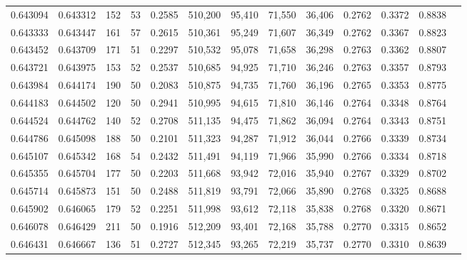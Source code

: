 \begin{tabular}{rrrrrrrrrrrrr}
0.643094 & 0.643312 &    152 &    53 &                                     0.2585 & 510,200 &  95,410 &  71,550 &  36,406 & 0.2762 & 0.3372 & 0.8838 \\
0.643333 & 0.643447 &    161 &    57 &                                     0.2615 & 510,361 &  95,249 &  71,607 &  36,349 & 0.2762 & 0.3367 & 0.8823 \\
0.643452 & 0.643709 &    171 &    51 &                                     0.2297 & 510,532 &  95,078 &  71,658 &  36,298 & 0.2763 & 0.3362 & 0.8807 \\
0.643721 & 0.643975 &    153 &    52 &                                     0.2537 & 510,685 &  94,925 &  71,710 &  36,246 & 0.2763 & 0.3357 & 0.8793 \\
0.643984 & 0.644174 &    190 &    50 &                                     0.2083 & 510,875 &  94,735 &  71,760 &  36,196 & 0.2765 & 0.3353 & 0.8775 \\
0.644183 & 0.644502 &    120 &    50 &                                     0.2941 & 510,995 &  94,615 &  71,810 &  36,146 & 0.2764 & 0.3348 & 0.8764 \\
0.644524 & 0.644762 &    140 &    52 &                                     0.2708 & 511,135 &  94,475 &  71,862 &  36,094 & 0.2764 & 0.3343 & 0.8751 \\
0.644786 & 0.645098 &    188 &    50 &                                     0.2101 & 511,323 &  94,287 &  71,912 &  36,044 & 0.2766 & 0.3339 & 0.8734 \\
0.645107 & 0.645342 &    168 &    54 &                                     0.2432 & 511,491 &  94,119 &  71,966 &  35,990 & 0.2766 & 0.3334 & 0.8718 \\
0.645355 & 0.645704 &    177 &    50 &                                     0.2203 & 511,668 &  93,942 &  72,016 &  35,940 & 0.2767 & 0.3329 & 0.8702 \\
0.645714 & 0.645873 &    151 &    50 &                                     0.2488 & 511,819 &  93,791 &  72,066 &  35,890 & 0.2768 & 0.3325 & 0.8688 \\
0.645902 & 0.646065 &    179 &    52 &                                     0.2251 & 511,998 &  93,612 &  72,118 &  35,838 & 0.2768 & 0.3320 & 0.8671 \\
0.646078 & 0.646429 &    211 &    50 &                                     0.1916 & 512,209 &  93,401 &  72,168 &  35,788 & 0.2770 & 0.3315 & 0.8652 \\
0.646431 & 0.646667 &    136 &    51 &                                     0.2727 & 512,345 &  93,265 &  72,219 &  35,737 & 0.2770 & 0.3310 & 0.8639 \\

\end{tabular}
